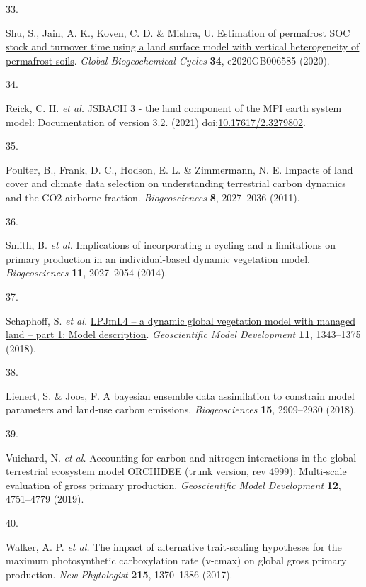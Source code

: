 \documentclass[
  12pt,
  letterpaper,
  DIV=11,
  numbers=noendperiod]{scrartcl}
\newlength{\cslhangindent}
\newlength{\csllabelwidth}
\newenvironment{CSLReferences}[2] %
 {\begin{list}{}{%
  \setlength{\itemindent}{0pt}
  \setlength{\leftmargin}{0pt}
  \setlength{\parsep}{0pt}
  \ifodd #1
   \setlength{\leftmargin}{\cslhangindent}
   \setlength{\itemindent}{-1\cslhangindent}
  \fi
  \setlength{\itemsep}{#2\baselineskip}}}
 {\end{list}}
\newcommand{\CSLLeftMargin}[1]{\parbox[t]{\csllabelwidth}{\strut#1\strut}}
\newcommand{\CSLRightInline}[1]{\parbox[t]{\linewidth - \csllabelwidth}{\strut#1\strut}}
\begin{document}
\begin{CSLReferences}{0}{0}
\CSLLeftMargin{33. }%
\CSLRightInline{Shu, S., Jain, A. K., Koven, C. D. \& Mishra, U.
\href{https://doi.org/10.1029/2020GB006585}{Estimation of permafrost SOC
stock and turnover time using a land surface model with vertical
heterogeneity of permafrost soils}. \emph{Global Biogeochemical Cycles}
\textbf{34}, e2020GB006585 (2020).}

\CSLLeftMargin{34. }%
\CSLRightInline{Reick, C. H. \emph{et al.} JSBACH 3 - the land component
of the MPI earth system model: Documentation of version 3.2. (2021)
doi:\href{https://doi.org/10.17617/2.3279802}{10.17617/2.3279802}.}

\CSLLeftMargin{35. }%
\CSLRightInline{Poulter, B., Frank, D. C., Hodson, E. L. \& Zimmermann,
N. E. Impacts of land cover and climate data selection on understanding
terrestrial carbon dynamics and the CO2 airborne fraction.
\emph{Biogeosciences} \textbf{8}, 2027--2036 (2011).}

\CSLLeftMargin{36. }%
\CSLRightInline{Smith, B. \emph{et al.} Implications of incorporating n
cycling and n limitations on primary production in an individual-based
dynamic vegetation model. \emph{Biogeosciences} \textbf{11}, 2027--2054
(2014).}

\CSLLeftMargin{37. }%
\CSLRightInline{Schaphoff, S. \emph{et al.}
\href{https://doi.org/10.5194/gmd-11-1343-2018}{LPJmL4 -- a dynamic
global vegetation model with managed land -- part 1: Model description}.
\emph{Geoscientific Model Development} \textbf{11}, 1343--1375 (2018).}

\CSLLeftMargin{38. }%
\CSLRightInline{Lienert, S. \& Joos, F. A bayesian ensemble data
assimilation to constrain model parameters and land-use carbon
emissions. \emph{Biogeosciences} \textbf{15}, 2909--2930 (2018).}

\CSLLeftMargin{39. }%
\CSLRightInline{Vuichard, N. \emph{et al.} Accounting for carbon and
nitrogen interactions in the global terrestrial ecosystem model ORCHIDEE
(trunk version, rev 4999): Multi-scale evaluation of gross primary
production. \emph{Geoscientific Model Development} \textbf{12},
4751--4779 (2019).}

\CSLLeftMargin{40. }%
\CSLRightInline{Walker, A. P. \emph{et al.} The impact of alternative
trait-scaling hypotheses for the maximum photosynthetic carboxylation
rate (v-cmax) on global gross primary production. \emph{New Phytologist}
\textbf{215}, 1370--1386 (2017).}


\end{CSLReferences}
\end{document}
